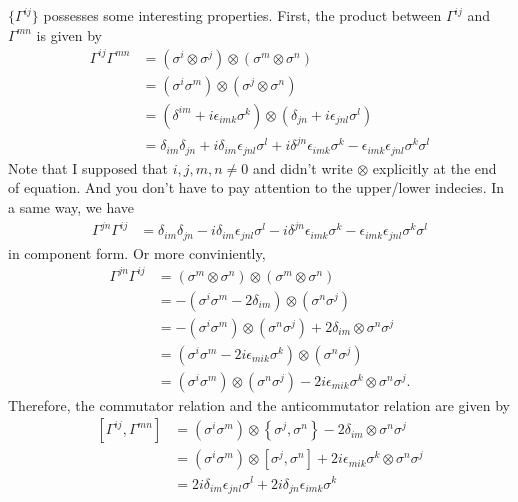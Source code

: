 $\{\Gamma^{ij}\}$ possesses some interesting properties. 
First, the product between $\Gamma^{ij}$ and $\Gamma^{mn}$ is given by 
\begin{align}
    \Gamma^{ij}\Gamma^{mn}  &= (\sigma^{i} \otimes \sigma^{j}) \otimes (\sigma^{m} \otimes \sigma^{n}) \nonumber \\ 
                            &= (\sigma^{i} \sigma^{m}) \otimes (\sigma^{j} \otimes \sigma^{n}) \nonumber \\
                            &= (\delta^{im} + i \epsilon_{imk} \sigma^{k}) \otimes (\delta_{jn} + i \epsilon_{jnl} \sigma^{l}) \nonumber \\
                            &= \delta_{im}\delta_{jn} + i \delta_{im}\epsilon_{jnl}\sigma^{l} + i \delta^{jn} \epsilon_{imk}\sigma^{k} - \epsilon_{imk}\epsilon_{jnl}\sigma^{k}\sigma^{l}  
\end{align}
Note that I supposed that $i,j,m,n \neq 0$ and didn't write $\otimes$ explicitly at the end of equation. 
And you don't have to pay attention to the upper/lower indecies.
In a same way, we have
\begin{align}
    \Gamma^{jn}\Gamma^{ij}  &= \delta_{im}\delta_{jn} - i \delta_{im}\epsilon_{jnl}\sigma^{l} - i \delta^{jn} \epsilon_{imk}\sigma^{k} - \epsilon_{imk}\epsilon_{jnl}\sigma^{k}\sigma^{l}  
\end{align}
in component form. Or more conviniently, 
\begin{align}
    \Gamma^{jn}\Gamma^{ij}  &= (\sigma^{m} \otimes \sigma^{n}) \otimes (\sigma^{m} \otimes \sigma^{n}) \nonumber \\ 
                            &= - (\sigma^{i} \sigma^{m} -2 \delta_{im}) \otimes (\sigma^{n}\sigma^{j}) \nonumber \\
                            &= - (\sigma^{i} \sigma^{m} ) \otimes (\sigma^{n} \sigma^{j} ) + 2 \delta_{im} \otimes \sigma^{n} \sigma^{j} \\  
                            &= (\sigma^{i} \sigma^{m} - 2i \epsilon_{mik} \sigma^{k}) \otimes (\sigma^{n}\sigma^{j}) \nonumber \\
                            &= (\sigma^{i} \sigma^{m} ) \otimes (\sigma^{n} \sigma^{j} ) - 2 i \epsilon_{mik} \sigma^{k} \otimes \sigma^{n} \sigma^{j}. 
\end{align}
Therefore, the commutator relation and the anticommutator relation are given by
\begin{align}
    \left[ \Gamma^{ij}, \Gamma^{mn} \right] &= (\sigma^{i}\sigma^{m}) \otimes \left\{ \sigma^{j}, \sigma^{n} \right\} - 2 \delta_{im} \otimes \sigma^{n}\sigma^{j} \\
                                            &= (\sigma^{i}\sigma^{m}) \otimes \left[ \sigma^{j}, \sigma^{n} \right] + 2i \epsilon_{mik} \sigma^{k} \otimes \sigma^{n}\sigma^{j} \\
                                            &= 2i \delta_{im}\epsilon_{jnl} \sigma^{l} + 2i \delta_{jn}\epsilon_{imk} \sigma^{k} 
\end{align}

